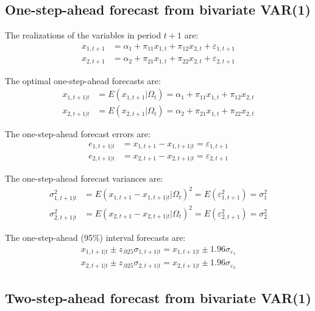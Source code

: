 \documentclass[
  12pt,
  oneside]{book}
\begin{document}
\hypertarget{one-step-ahead-forecast-from-bivariate-var1}{%
\subsection{One-step-ahead forecast from bivariate VAR(1)}\label{one-step-ahead-forecast-from-bivariate-var1}}

The realizations of the variables in period \(t+1\) are:
\[\begin{aligned}
x_{1,t+1} &= \alpha_1 + \pi_{11} x_{1,t} + \pi_{12} x_{2,t} + \varepsilon_{1,t+1} \\
x_{2,t+1} &= \alpha_2 + \pi_{21} x_{1,t} + \pi_{22} x_{2,t} + \varepsilon_{2,t+1}
\end{aligned}\]

The optimal one-step-ahead forecasts are:
\[\begin{aligned}
x_{1,t+1|t} &= E(x_{1,t+1}|\Omega_t) = \alpha_1 + \pi_{11} x_{1,t} + \pi_{12} x_{2,t} \\
x_{2,t+1|t} &= E(x_{2,t+1}|\Omega_t) = \alpha_2 + \pi_{21} x_{1,t} + \pi_{22} x_{2,t}
\end{aligned}\]

The one-step-ahead forecast errors are:
\[\begin{aligned}
e_{1,t+1|t} &= x_{1,t+1} - x_{1,t+1|t} = \varepsilon_{1,t+1} \\
e_{2,t+1|t} &= x_{2,t+1} - x_{2,t+1|t} = \varepsilon_{2,t+1}
\end{aligned}\]

The one-step-ahead forecast variances are:
\[\begin{aligned}
\sigma_{1,t+1|t}^2 &= E(x_{1,t+1} - x_{1,t+1|t}|\Omega_t)^2 = E(\varepsilon_{1,t+1}^2) = \sigma_{1}^2 \\
\sigma_{2,t+1|t}^2 &= E(x_{2,t+1} - x_{2,t+1|t}|\Omega_t)^2 = E(\varepsilon_{2,t+1}^2) = \sigma_{2}^2
\end{aligned}\]

The one-step-ahead (95\%) interval forecasts are:
\[\begin{aligned}
x_{1,t+1|t} \pm z_{.025}\sigma_{1,t+1|t} = x_{1,t+1|t} \pm 1.96\sigma_{\varepsilon_1} \\
x_{2,t+1|t} \pm z_{.025}\sigma_{2,t+1|t} = x_{2,t+1|t} \pm 1.96\sigma_{\varepsilon_2}
\end{aligned}\]

\hypertarget{two-step-ahead-forecast-from-bivariate-var1}{%
\subsection{Two-step-ahead forecast from bivariate VAR(1)}\label{two-step-ahead-forecast-from-bivariate-var1}}
\end{document}

